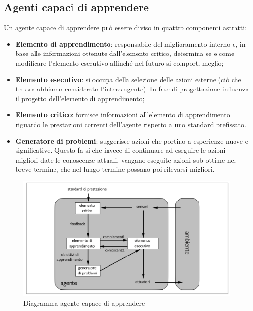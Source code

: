 \documentclass{article}
\begin{document}
\subsection{Agenti capaci di apprendere}
Un agente capace di apprendere può essere diviso in quattro componenti astratti:
\begin{itemize}
    \item \textbf{Elemento di apprendimento}: responsabile del miglioramento interno e, in base alle informazioni ottenute dall'elemento critico, determina se e come modificare l'elemento esecutivo affinché nel futuro si comporti meglio;
    \item \textbf{Elemento esecutivo}: si occupa della selezione delle azioni esterne (ciò che fin ora abbiamo considerato l'intero agente). In fase di progettazione influenza il progetto dell'elemento di apprendimento;
    \item \textbf{Elemento critico}: fornisce informazioni all'elemento di apprendimento riguardo le prestazioni correnti dell'agente rispetto a uno standard prefissato.
    \item \textbf{Generatore di problemi}: suggerisce azioni che portino a esperienze nuove e significative. Questo fa si che invece di continuare ad eseguire le azioni migliori date le conoscenze attuali, vengano eseguite azioni sub-ottime nel breve termine, che nel lungo termine possano poi rilevarsi migliori.
\end{itemize}
\begin{figure}[H]
    \centering
    \includegraphics[width=0.5\linewidth]{Images/AgenteCapaceDiApprendere.png}
    \caption{Diagramma agente capace di apprendere}
    \label{fig:enter-label}
\end{figure}
\newpage
\end{document}
